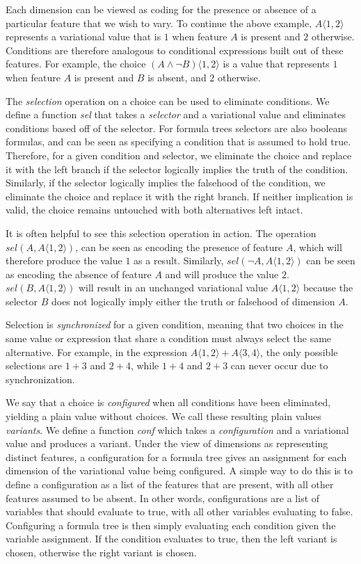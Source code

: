 \documentclass[letterpaper,10pt,onecolumn]{article}
\newcommand{\tagtree}[3]{#1 \langle #2, #3 \rangle}
\begin{document}
Each dimension can be viewed as coding for the presence or absence of a
particular feature that we wish to vary. To continue the above example, $\tagtree{A}{1}{2}$
represents a variational value that is $1$ when feature $A$ is present and $2$ otherwise. Conditions
are therefore analogous to conditional expressions built out of these features. For example, the choice $\tagtree{(A \wedge \neg B)}{1}{2}$
is a value that represents $1$ when feature $A$ is present and $B$ is absent, and $2$ otherwise.

The \emph{selection} operation on a choice can be used to eliminate conditions. We define a function
\emph{sel} that takes a \emph{selector} and a variational value and eliminates conditions based off
of the selector. For formula trees selectors are also booleans formulas, and can be seen as specifying
a condition that is assumed to hold true. Therefore, for a given condition and
selector, we eliminate the choice and replace it with the left branch if the selector logically implies
the truth of the condition. Similarly, if the selector logically implies the falsehood of the condition, we eliminate the choice
and replace it with the right branch. If neither implication is valid, the choice remains untouched with
both alternatives left intact.

It is often helpful to see this selection operation in action. The operation
$\mathit{sel}(A,\tagtree{A}{1}{2})$, can be seen as encoding the presence of feature $A$, which
will therefore produce the value $1$ as a result. Similarly, $\mathit{sel}(\neg A,\tagtree{A}{1}{2})$ can be seen as encoding the absence of feature $A$ and will
produce the value $2$. $\mathit{sel}(B,\tagtree{A}{1}{2})$ will result in an unchanged variational
value $\tagtree{A}{1}{2}$ because the selector $B$ does not logically imply either the truth or falsehood
of dimension $A$.

Selection is \emph{synchronized} for a given
condition, meaning that two choices in the same value or expression that share a condition must always
select the same alternative. For example, in the expression $\tagtree{A}{1}{2}+\tagtree{A}{3}{4}$,
the only possible selections are $1+3$ and $2+4$, while $1+4$ and $2+3$ can never occur due
to synchronization.

We say that a choice is \emph{configured} when all conditions
have been eliminated, yielding a plain value without choices. We call these resulting plain values
\emph{variants}. We define a function \emph{conf} which takes a
\emph{configuration} and a variational value and produces a variant. Under the view of dimensions as representing distinct features, a configuration for a formula tree gives
an assignment for each dimension of the variational value being configured.
A simple way to do this is to define a configuration as a list of the features that are present, with all
other features assumed to be absent. In other words, configurations are a list of variables that should
evaluate to true, with all other variables evaluating to false. Configuring a formula tree is then simply evaluating
each condition given the variable assignment. If the condition evaluates to true, then the left variant
is chosen, otherwise the right variant is chosen.
\end{document}
